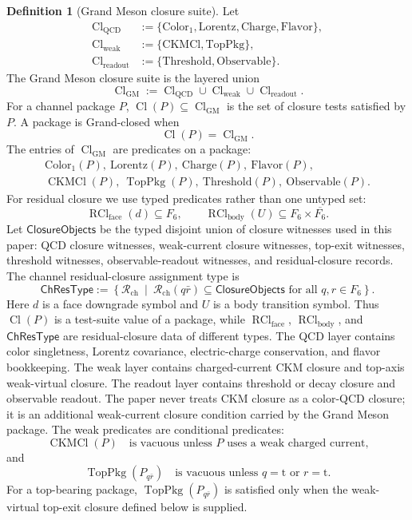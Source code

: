 \documentclass[11pt]{article}
\theoremstyle{definition}
\newtheorem{definition}{Definition}
\theoremstyle{plain}
\DeclareMathOperator{\Cl}{Cl}
\DeclareMathOperator{\TopPkg}{TopPkg}
\DeclareMathOperator{\RCl}{RCl}
\DeclareMathOperator{\CKMCl}{CKMCl}
\newcommand{\qt}{\mathrm t}
\begin{document}
\begin{definition}[Grand Meson closure suite]
Let
\[
\begin{aligned}
  \Cl_{\mathrm{QCD}}
  &:=
  \{\mathrm{Color}_1,\mathrm{Lorentz},\mathrm{Charge},
    \mathrm{Flavor}\},
  \\
  \Cl_{\mathrm{weak}}
  &:=
  \{\mathrm{CKMCl},\mathrm{TopPkg}\},
  \\
  \Cl_{\mathrm{readout}}
  &:=
  \{\mathrm{Threshold},\mathrm{Observable}\}.
\end{aligned}
\]
The Grand Meson closure suite is the layered union
\[
  \Cl_{\mathrm{GM}}
  :=
  \Cl_{\mathrm{QCD}}\cup\Cl_{\mathrm{weak}}\cup\Cl_{\mathrm{readout}}.
\]
For a channel package \(P\), \(\Cl(P)\subseteq\Cl_{\mathrm{GM}}\) is the
set of closure tests satisfied by \(P\).  A package is Grand-closed when
\[
  \Cl(P)=\Cl_{\mathrm{GM}}.
\]
The entries of \(\Cl_{\mathrm{GM}}\) are predicates on a package:
\[
  \begin{gathered}
  \mathrm{Color}_1(P),\ \mathrm{Lorentz}(P),\
  \mathrm{Charge}(P),\ \mathrm{Flavor}(P),\\
  \CKMCl(P),\ \TopPkg(P),\
  \mathrm{Threshold}(P),\ \mathrm{Observable}(P).
  \end{gathered}
\]
For residual closure we use typed predicates rather than one untyped set:
\[
  \RCl_{\mathrm{face}}(d)\subseteq F_6,\qquad
  \RCl_{\mathrm{body}}(U)\subseteq F_6\times\overline{F_6}.
\]
Let \(\mathsf{ClosureObjects}\) be the typed disjoint union of closure
witnesses used in this paper: QCD closure witnesses, weak-current closure
witnesses, top-exit witnesses, threshold witnesses, observable-readout
witnesses, and residual-closure records.
The channel residual-closure assignment type is
\[
  \mathsf{ChResType}
  :=
  \left\{
  \mathcal R_{\mathrm{ch}}
  \ \middle|\
  \mathcal R_{\mathrm{ch}}(q\bar r)\subseteq\mathsf{ClosureObjects}
  \text{ for all }q,r\in F_6
  \right\}.
\]
Here \(d\) is a face downgrade symbol and \(U\) is a body transition
symbol.  Thus \(\Cl(P)\) is a test-suite value of a package, while
\(\RCl_{\mathrm{face}}\), \(\RCl_{\mathrm{body}}\), and
\(\mathsf{ChResType}\) are residual-closure data of different types.
The QCD layer contains color singletness, Lorentz covariance,
electric-charge conservation, and flavor bookkeeping.  The weak layer
contains charged-current CKM closure and top-axis weak-virtual closure.
The readout layer contains threshold or decay closure and observable
readout.  The paper never treats CKM closure as a color-QCD closure; it is
an additional weak-current closure condition carried by the Grand Meson
package.
The weak predicates are conditional predicates:
\[
  \CKMCl(P)
  \quad\text{is vacuous unless }P\text{ uses a weak charged current,}
\]
and
\[
  \TopPkg(P_{q\bar r})
  \quad\text{is vacuous unless }q=\qt\text{ or }r=\qt.
\]
For a top-bearing package, \(\TopPkg(P_{q\bar r})\) is satisfied only
when the weak-virtual top-exit closure defined below is supplied.
\end{definition}
\end{document}
